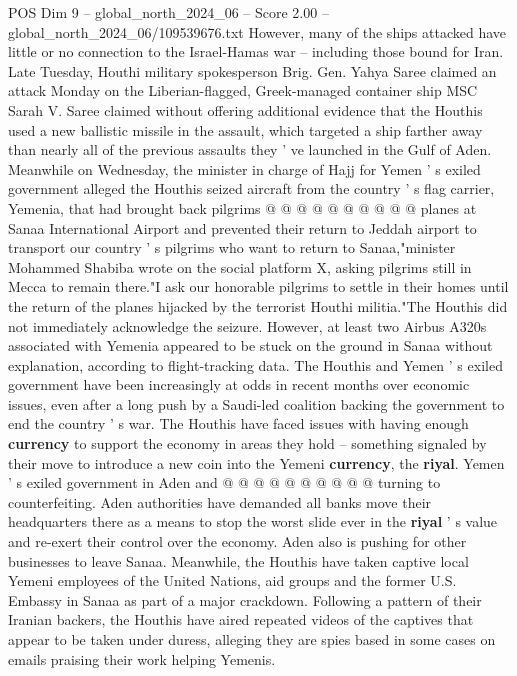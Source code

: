 \begin{textsample}{POS Dim 9 – global\_north\_2024\_06 – Score 2.00 – global\_north\_2024\_06/109539676.txt}
However, many of the ships attacked have little or no connection to the Israel-Hamas war -- including those bound for Iran.
Late Tuesday, Houthi military spokesperson Brig.
Gen.
Yahya Saree claimed an attack Monday on the Liberian-flagged, Greek-managed container ship MSC Sarah V.
Saree claimed without offering additional evidence that the Houthis used a new ballistic missile in the assault, which targeted a ship farther away than nearly all of the previous assaults they ' ve launched in the Gulf of Aden.
Meanwhile on Wednesday, the minister in charge of Hajj for Yemen ' s exiled government alleged the Houthis seized aircraft from the country ' s flag carrier, Yemenia, that had brought back pilgrims @ @ @ @ @ @ @ @ @ @ planes at Sanaa International Airport and prevented their return to Jeddah airport to transport our country ' s pilgrims who want to return to Sanaa,"minister Mohammed Shabiba wrote on the social platform X, asking pilgrims still in Mecca to remain there."I ask our honorable pilgrims to settle in their homes until the return of the planes hijacked by the terrorist Houthi militia."The Houthis did not immediately acknowledge the seizure.
However, at least two Airbus A320s associated with Yemenia appeared to be stuck on the ground in Sanaa without explanation, according to flight-tracking data.
The Houthis and Yemen ' s exiled government have been increasingly at odds in recent months over economic issues, even after a long push by a Saudi-led coalition backing the government to end the country ' s war.
The Houthis have faced issues with having enough \textbf{currency} to support the economy in areas they hold -- something signaled by their move to introduce a new coin into the Yemeni \textbf{currency}, the \textbf{riyal}.
Yemen ' s exiled government in Aden and @ @ @ @ @ @ @ @ @ @ turning to counterfeiting.
Aden authorities have demanded all banks move their headquarters there as a means to stop the worst slide ever in the \textbf{riyal} ' s value and re-exert their control over the economy.
Aden also is pushing for other businesses to leave Sanaa.
Meanwhile, the Houthis have taken captive local Yemeni employees of the United Nations, aid groups and the former U.S.
Embassy in Sanaa as part of a major crackdown.
Following a pattern of their Iranian backers, the Houthis have aired repeated videos of the captives that appear to be taken under duress, alleging they are spies based in some cases on emails praising their work helping Yemenis.

\end{textsample}
